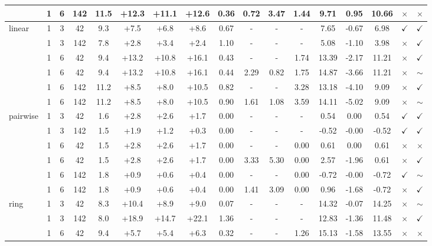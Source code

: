 \documentclass[
    reprint,
    amsmath, amssymb,
    aps,
    floatfix,
    nofootinbib
]{revtex4-1}
\begin{document}
\begin{table}[h!]
{\begin{tabular}{l|cc|c|c|ccc|cccc|ccc|cc}
 & 1 & 6 & 142 & 11.5 & +12.3 & +11.1 & +12.6 & 0.36 & 0.72 & 3.47 & 1.44 & 9.71 & 0.95 & 10.66 & $\times$ & $\times$ \\
\midrule
\hline
\multirow{6}{*}{linear} & 1 & 3 & 42 & 9.3 & +7.5 & +6.8 & +8.6 & 0.67 & - & - & - & 7.65 & -0.67 & 6.98 & $\checkmark$ & $\checkmark$ \\
 & 1 & 3 & 142 & 7.8 & +2.8 & +3.4 & +2.4 & 1.10 & - & - & - & 5.08 & -1.10 & 3.98 & $\times$ & $\checkmark$ \\
 & 1 & 6 & 42 & 9.4 & +13.2 & +10.8 & +16.1 & 0.43 & - & - & 1.74 & 13.39 & -2.17 & 11.21 & $\times$ & $\checkmark$ \\
 & 1 & 6 & 42 & 9.4 & +13.2 & +10.8 & +16.1 & 0.44 & 2.29 & 0.82 & 1.75 & 14.87 & -3.66 & 11.21 & $\times$ & $\sim$ \\
 & 1 & 6 & 142 & 11.2 & +8.5 & +8.0 & +10.5 & 0.82 & - & - & 3.28 & 13.18 & -4.10 & 9.09 & $\times$ & $\checkmark$ \\
 & 1 & 6 & 142 & 11.2 & +8.5 & +8.0 & +10.5 & 0.90 & 1.61 & 1.08 & 3.59 & 14.11 & -5.02 & 9.09 & $\times$ & $\sim$ \\
\midrule
\hline
\multirow{6}{*}{pairwise} & 1 & 3 & 42 & 1.6 & +2.8 & +2.6 & +1.7 & 0.00 & - & - & - & 0.54 & 0.00 & 0.54 & $\checkmark$ & $\checkmark$ \\
 & 1 & 3 & 142 & 1.5 & +1.9 & +1.2 & +0.3 & 0.00 & - & - & - & -0.52 & -0.00 & -0.52 & $\checkmark$ & $\checkmark$ \\
 & 1 & 6 & 42 & 1.5 & +2.8 & +2.6 & +1.7 & 0.00 & - & - & 0.00 & 0.61 & 0.00 & 0.61 & $\times$ & $\times$ \\
 & 1 & 6 & 42 & 1.5 & +2.8 & +2.6 & +1.7 & 0.00 & 3.33 & 5.30 & 0.00 & 2.57 & -1.96 & 0.61 & $\times$ & $\checkmark$ \\
 & 1 & 6 & 142 & 1.8 & +0.9 & +0.6 & +0.4 & 0.00 & - & - & 0.00 & -0.72 & -0.00 & -0.72 & $\checkmark$ & $\sim$ \\
 & 1 & 6 & 142 & 1.8 & +0.9 & +0.6 & +0.4 & 0.00 & 1.41 & 3.09 & 0.00 & 0.96 & -1.68 & -0.72 & $\times$ & $\checkmark$ \\
\midrule
\hline
\multirow{6}{*}{ring} & 1 & 3 & 42 & 8.3 & +10.4 & +8.9 & +9.0 & 0.07 & - & - & - & 14.32 & -0.07 & 14.25 & $\times$ & $\sim$ \\
 & 1 & 3 & 142 & 8.0 & +18.9 & +14.7 & +22.1 & 1.36 & - & - & - & 12.83 & -1.36 & 11.48 & $\times$ & $\checkmark$ \\
 & 1 & 6 & 42 & 9.4 & +5.7 & +5.4 & +6.3 & 0.32 & - & - & 1.26 & 15.13 & -1.58 & 13.55 & $\times$ & $\times$ \\

\end{tabular}}
\end{table}
\end{document}
